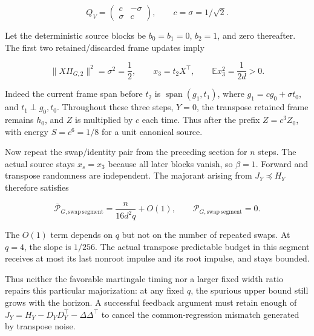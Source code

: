 \documentclass[11pt,oneside,openany,a4paper]{book}
\numberwithin{equation}{chapter}
\theoremstyle{definition}
\theoremstyle{remark}
\begin{document}
\[
Q_V=\begin{pmatrix}c&-\sigma\\\sigma&c\end{pmatrix},
\qquad c=\sigma=1/\sqrt2.
\]

Let the deterministic source blocks be \(b_0=b_1=0\), \(b_2=1\), and zero thereafter. The first two retained/discarded frame updates imply

\[
\|X\Pi_{G,2}\|^2=\sigma^2=\frac12,
\qquad x_3=t_2X^{\top},\qquad
\mathbb E x_3^2=\frac1{2d}>0.
\]

Indeed the current frame span before \(t_2\) is \(\operatorname{span}(g_1,t_1)\), where \(g_1=cg_0+\sigma t_0\), and \(t_1\perp g_0,t_0\). Throughout these three steps, \(Y=0\), the transpose retained frame remains \(h_0\), and \(Z\) is multiplied by \(c\) each time. Thus after the prefix \(Z=c^3Z_0\), with energy \(S=c^6=1/8\) for a unit canonical source.

Now repeat the swap/identity pair from the preceding section for \(n\) steps. The actual source stays \(x_s=x_3\) because all later blocks vanish, so \(\beta=1\). Forward and transpose randomness are independent. The majorant arising from \(J_Y\preceq H_Y\) therefore satisfies

\[
\boxed{
\overline{\mathcal P}_{G,\mathrm{swap\ segment}}
=\frac{n}{16d^2q}+O(1),
\qquad \mathcal P_{G,\mathrm{swap\ segment}}=0.}
\]

The \(O(1)\) term depends on \(q\) but not on the number of repeated swaps. At \(q=4\), the slope is \(1/256\). The actual transpose predictable budget in this segment receives at most its last nonroot impulse and its root impulse, and stays bounded.

Thus neither the favorable martingale timing nor a larger fixed width ratio repairs this particular majorization: at any fixed \(q\), the spurious upper bound still grows with the horizon. A successful feedback argument must retain enough of \(J_Y=H_Y-D_YD_Y^{\top}-\Delta\Delta^{\top}\) to cancel the common-regression mismatch generated by transpose noise.

\endgroup
\end{document}
